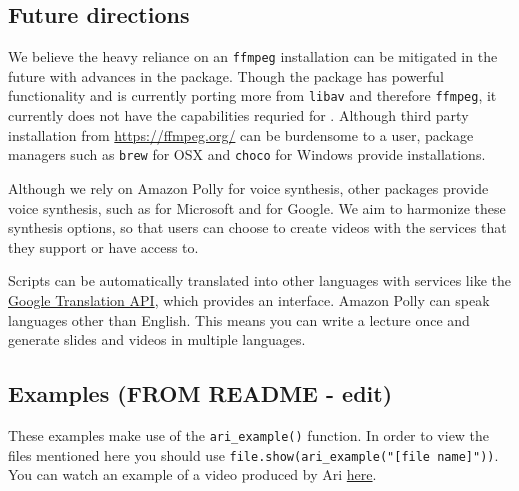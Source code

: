\hypertarget{future-directions}{%
\subsection{Future directions}\label{future-directions}}

We believe the heavy reliance on an \texttt{ffmpeg} installation can be
mitigated in the future with advances in the  package. Though
the  package has powerful functionality and is currently porting
more from \texttt{libav} and therefore \texttt{ffmpeg}, it currently
does not have the capabilities requried for . Although third
party installation from \url{https://ffmpeg.org/} can be burdensome to a
user, package managers such as \texttt{brew} for OSX and \texttt{choco}
for Windows provide installations.

Although we rely on Amazon Polly for voice synthesis, other packages
provide voice synthesis, such as  for Microsoft and
 for Google. We aim to harmonize these
synthesis options, so that users can choose to create videos with the
services that they support or have access to.

Scripts can be automatically translated into other languages with
services like the \href{https://cloud.google.com/translate/docs/}{Google
Translation API}, which  provides an interface.
Amazon Polly can speak languages other than English. This means you can
write a lecture once and generate slides and videos in multiple
languages.

\hypertarget{examples-from-readme---edit}{%
\subsection{Examples (FROM README -
edit)}\label{examples-from-readme---edit}}

These examples make use of the \texttt{ari\_example()} function. In
order to view the files mentioned here you should use
\texttt{file.show(ari\_example("{[}file\ name{]}"))}. You can watch an
example of a video produced by Ari
\href{https://youtu.be/dcIUu4GCOKU}{here}.


